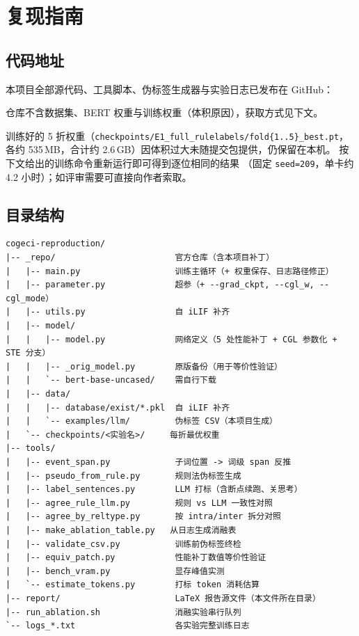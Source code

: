 \section{复现指南}
\label{sec:reproduce}

\subsection{代码地址}

本项目全部源代码、工具脚本、伪标签生成器与实验日志已发布在 GitHub：

\begin{center}
\end{center}

仓库不含数据集、BERT 权重与训练权重（体积原因），获取方式见下文。

训练好的 5 折权重（\texttt{checkpoints/E1\_full\_rulelabels/fold\{1..5\}\_best.pt}，
各约 535\,MB，合计约 2.6\,GB）因体积过大未随提交包提供，仍保留在本机。
按下文给出的训练命令重新运行即可得到逐位相同的结果
（固定 \texttt{seed=209}，单卡约 4.2 小时）；如评审需要可直接向作者索取。

\subsection{目录结构}

\begin{lstlisting}[basicstyle=\ttfamily\scriptsize]
cogeci-reproduction/
|-- _repo/                        官方仓库（含本项目补丁）
|   |-- main.py                   训练主循环（+ 权重保存、日志路径修正）
|   |-- parameter.py              超参（+ --grad_ckpt, --cgl_w, --cgl_mode）
|   |-- utils.py                  自 iLIF 补齐
|   |-- model/
|   |   |-- model.py              网络定义（5 处性能补丁 + CGL 参数化 + STE 分支）
|   |   |-- _orig_model.py        原版备份（用于等价性验证）
|   |   `-- bert-base-uncased/    需自行下载
|   |-- data/
|   |   |-- database/exist/*.pkl  自 iLIF 补齐
|   |   `-- examples/llm/         伪标签 CSV（本项目生成）
|   `-- checkpoints/<实验名>/     每折最优权重
|-- tools/
|   |-- event_span.py             子词位置 -> 词级 span 反推
|   |-- pseudo_from_rule.py       规则法伪标签生成
|   |-- label_sentences.py        LLM 打标（含断点续跑、关思考）
|   |-- agree_rule_llm.py         规则 vs LLM 一致性对照
|   |-- agree_by_reltype.py       按 intra/inter 拆分对照
|   |-- make_ablation_table.py   从日志生成消融表
|   |-- validate_csv.py           训练前伪标签终检
|   |-- equiv_patch.py            性能补丁数值等价性验证
|   |-- bench_vram.py             显存峰值实测
|   `-- estimate_tokens.py        打标 token 消耗估算
|-- report/                       LaTeX 报告源文件（本文件所在目录）
|-- run_ablation.sh               消融实验串行队列
`-- logs_*.txt                    各实验完整训练日志
\end{lstlisting}

